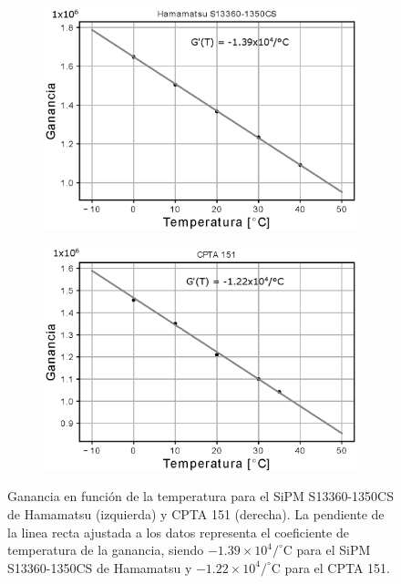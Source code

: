 \begin{figure}[h!]
     \centering
     \begin{subfigure}[b]{0.49\textwidth}
         \centering
         \includegraphics[width=1.1\textwidth]{Images/GT_1350CS.eps}
         \caption{}
         \label{fig:GT_1350CS}
     \end{subfigure}
     \begin{subfigure}[b]{0.49\textwidth}
         \centering
         \includegraphics[width=1.1\textwidth]{Images/GT_CPTA.eps}
         \caption{}
         \label{fig:GT_CPTA}
     \end{subfigure}
        \caption{Ganancia en función de la temperatura para el SiPM S13360-1350CS de Hamamatsu (izquierda) y CPTA 151 (derecha). La pendiente de la linea recta ajustada a los datos representa el coeficiente de temperatura de la ganancia, siendo $-1.39\times10^4/^\circ$C para el SiPM S13360-1350CS de Hamamatsu y $-1.22\times10^4/^\circ$C para el CPTA 151.}
        \label{fig:Gain_vs_T}
\end{figure}
